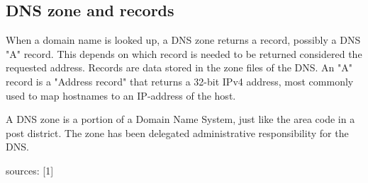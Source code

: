 \subsection{DNS zone and records}
When a domain name is looked up,  a DNS zone returns a record, possibly a DNS "A" record. This depends on which record is needed to be returned considered the requested address. Records are data stored in the zone files of the DNS. An "A" record is a "Address record" that returns a 32-bit IPv4 address, most commonly used to map hostnames to an IP-address of the host.

A DNS zone is a portion of a Domain Name System, just like the area code in a post district. The zone has been delegated administrative responsibility for the DNS.

sources:
[1]